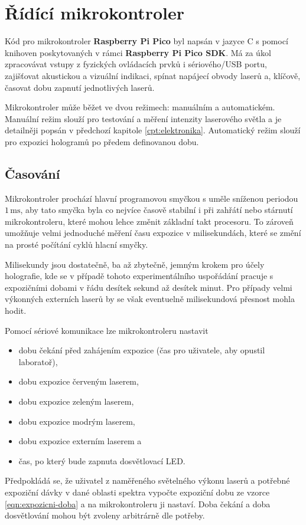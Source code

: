 \documentclass[twoside,project]{../MFFPrace}
\begin{document}

\section{Řídící mikrokontroler}
Kód pro mikrokontroler \textbf{Raspberry Pi Pico} byl napsán v jazyce C s pomocí knihoven poskytovaných v rámci \textbf{Raspberry Pi Pico SDK}. Má za úkol zpracovávat vstupy z fyzických ovládacích prvků i sériového/USB portu, zajišťovat akustickou a vizuální indikaci, spínat napájecí obvody laserů a, klíčově, časovat dobu zapnutí jednotlivých laserů.

Mikrokontroler může běžet ve dvou režimech: manuálním a automatickém. Manuální režim slouží pro testování a měření intenzity laserového světla a je detailněji popsán v předchozí kapitole \ref{cpt:elektronika}. Automatický režim slouží pro expozici hologramů po předem definovanou dobu.

\subsection{Časování}
Mikrokontroler prochází hlavní programovou smyčkou s uměle sníženou periodou $1\,\text{ms}$, aby tato smyčka byla co nejvíce časově stabilní i při zahřátí nebo stárnutí mikrokontroleru, které mohou lehce změnit základní takt procesoru. To zároveň umožňuje velmi jednoduché měření času expozice v milisekundách, které se změní na prosté počítání cyklů hlacní smyčky.

Milisekundy jsou dostatečně, ba až zbytečně, jemným krokem pro účely holografie, kde se v případě tohoto experimentálního uspořádání pracuje s expozičními dobami v řádu desítek sekund až desítek minut. Pro případy velmi výkonných externích laserů by se však eventuelně milisekundová přesnost mohla hodit.

\medskip

Pomocí sériové komunikace lze mikrokontroleru nastavit
\begin{itemize}
    \item dobu čekání před zahájením expozice (čas pro uživatele, aby opustil laboratoř),
    \item dobu expozice červeným laserem,
    \item dobu expozice zeleným laserem,
    \item dobu expozice modrým laserem,
    \item dobu expozice externím laserem a
    \item čas, po který bude zapnuta dosvětlovací LED.
\end{itemize}
Předpokládá se, že uživatel z naměřeného světelného výkonu laserů a potřebné expoziční dávky v dané oblasti spektra vypočte expoziční dobu ze vzorce \eqref{eqn:expozicni-doba} a na mikrokontroleru ji nastaví. Doba čekání a doba dosvětlování mohou být zvoleny arbitrárně dle potřeby.
\end{document}
